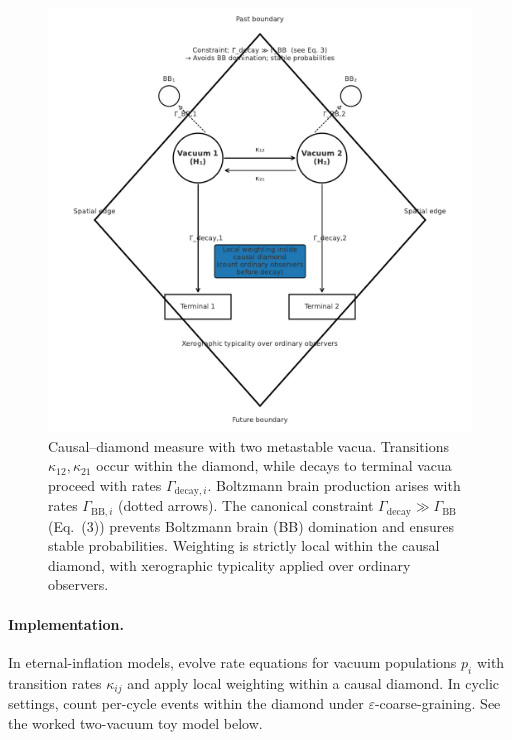 \documentclass[12pt]{article}
\theoremstyle{remark}
\begin{document}
\begin{figure}[t]
  \centering
  \includegraphics[width=0.85\linewidth]{figs/fig_causal_diamond_measure.pdf}
  \caption{Causal–diamond measure with two metastable vacua. 
  Transitions $\kappa_{12}, \kappa_{21}$ occur within the diamond, 
  while decays to terminal vacua proceed with rates $\Gamma_{\mathrm{decay},i}$. 
  Boltzmann brain production arises with rates $\Gamma_{\mathrm{BB},i}$ (dotted arrows). 
  The canonical constraint $\Gamma_{\mathrm{decay}} \gg \Gamma_{\mathrm{BB}}$ (Eq.~(3)) 
  prevents Boltzmann brain (BB) domination and ensures stable probabilities. 
  Weighting is strictly local within the causal diamond, with xerographic typicality 
  applied over ordinary observers.}
  \label{fig:diamond-measure}
\end{figure}

\paragraph{Implementation.} In eternal-inflation models, evolve rate equations for vacuum populations $p_i$ with transition rates $\kappa_{ij}$ and apply local weighting within a causal diamond. In cyclic settings, count per-cycle events within the diamond under $\varepsilon$-coarse-graining. See the worked two-vacuum toy model below.
\end{document}
